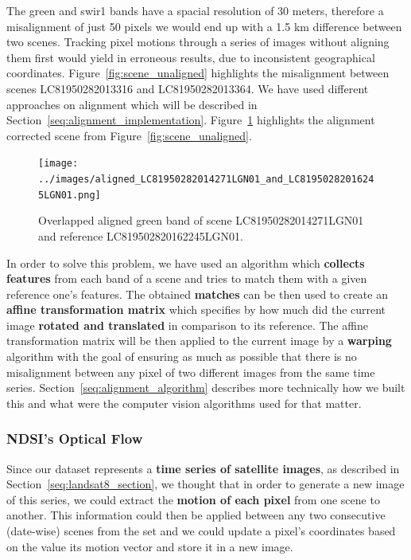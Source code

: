 \documentclass[12pt, a4paper]{report}
\begin{document}
	\par The green and swir1 bands have a spacial resolution of 30 meters, therefore a misalignment of just 50 pixels we would end up with a 1.5 km difference between two scenes. Tracking pixel motions through a series of images without aligning them first would yield in erroneous results, due to inconsistent geographical coordinates. Figure~\ref{fig:scene_unaligned} highlights the misalignment between scenes LC81950282013316 and LC81950282013364. We have used different approaches on alignment which will be described in Section~\ref{seq:alignment_implementation}. Figure~\ref{fig:scene_aligned} highlights the alignment corrected scene from Figure~\ref{fig:scene_unaligned}. 
	
	\begin{figure}[h!]
		\centering
		\texttt{[image: ../images/aligned\_LC81950282014271LGN01\_and\_LC81950282016245LGN01.png]}
		\caption{Overlapped aligned green band of scene LC81950282014271LGN01 and reference LC819502820162245LGN01.}
		\label{fig:scene_aligned}
	\end{figure}

	\par In order to solve this problem, we have used an algorithm which \textbf{collects features} from each band of a scene and tries to match them with a given reference one's features. The obtained \textbf{matches} can be then used to create an \textbf{affine transformation matrix} which specifies by how much did the current image \textbf{rotated and translated} in comparison to its reference. The affine transformation matrix will be then applied to the current image by a \textbf{warping} algorithm with the goal of ensuring as much as possible that there is no misalignment between any pixel of two different images from the same time series. Section~\ref{seq:alignment_algorithm} describes more technically how we built this and what were the computer vision algorithms used for that matter. 

	\subsubsection{NDSI's Optical Flow}
	\label{seq:ndsi_motion_matrix}
	
	\par Since our dataset represents a \textbf{time series of satellite images}, as described in Section~\ref{seq:landsat8_section}, we thought that in order to generate a new image of this series, we could extract the \textbf{motion of each pixel} from one scene to another. This information could then be applied between any two consecutive (date-wise) scenes from the set and we could update a pixel's coordinates based on the value its motion vector and store it in a new image.
	
\end{document}
